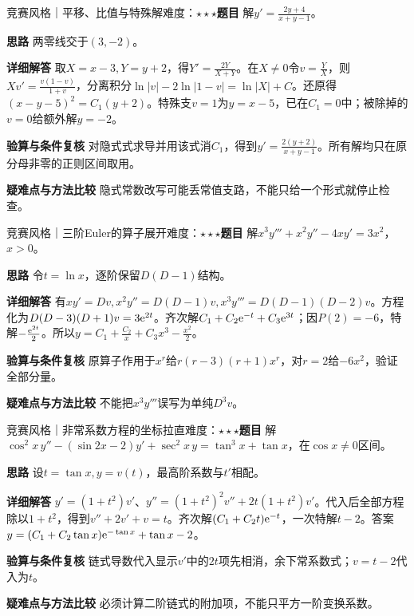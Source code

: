 \begin{example}{竞赛风格｜平移、比值与特殊解}{难度：$\star\star\star$}\label{ic:ex:delta_ode:affinecase}\textbf{题目} 解$y'=\frac{2y+4}{x+y-1}$。\par \textbf{思路} 两零线交于$(3,-2)$。\par \textbf{详细解答} 取$X=x-3,Y=y+2$，得$Y'=\frac{2Y}{X+Y}$。在$X\ne0$令$v=\frac{Y}{X}$，则$Xv'=\frac{v(1-v)}{1+v}$，分离积分$\ln|v|-2\ln|1-v|=\ln|X|+C$。还原得$(x-y-5)^2=C_1(y+2)$。特殊支$v=1$为$y=x-5$，已在$C_1=0$中；被除掉的$v=0$给额外解$y=-2$。\par \textbf{验算与条件复核} 对隐式式求导并用该式消$C_1$，得到$y'=\frac{2(y+2)}{x+y-1}$。所有解均只在原分母非零的正则区间取用。\par \textbf{疑难点与方法比较} 隐式常数改写可能丢常值支路，不能只给一个形式就停止检查。\end{example}

\begin{example}{竞赛风格｜三阶Euler的算子展开}{难度：$\star\star\star$}\label{ic:ex:delta_ode:eulerthirdorder}\textbf{题目} 解$x^3y'''+x^2y''-4xy'=3x^2$，$x>0$。\par \textbf{思路} 令$t=\ln x$，逐阶保留$D(D-1)$结构。\par \textbf{详细解答} 有$xy'=Dv,x^2y''=D(D-1)v,x^3y'''=D(D-1)(D-2)v$。方程化为$D(D-3)(D+1)v=3\mathrm{e}^{2t}$。齐次解$C_1+C_2\mathrm{e}^{-t}+C_3\mathrm{e}^{3t}$；因$P(2)=-6$，特解$-\frac{\mathrm{e}^{2t}}{2}$。所以$y=C_1+\frac{C_2}{x}+C_3x^3-\frac{x^2}{2}$。\par \textbf{验算与条件复核} 原算子作用于$x^r$给$r(r-3)(r+1)x^r$，对$r=2$给$-6x^2$，验证全部分量。\par \textbf{疑难点与方法比较} 不能把$x^3y'''$误写为单纯$D^3v$。\end{example}

\begin{example}{竞赛风格｜非常系数方程的坐标拉直}{难度：$\star\star\star$}\label{ic:ex:delta_ode:tangentcoordinate}\textbf{题目} 解$\cos^2x\,y''-(\sin2x-2)y'+\sec^2x\,y=\tan^3x+\tan x$，在$\cos x\ne0$区间。\par \textbf{思路} 设$t=\tan x,y=v(t)$，最高阶系数与$t'$相配。\par \textbf{详细解答} $y'=(1+t^2)v'$、$y''=(1+t^2)^2v''+2t(1+t^2)v'$。代入后全部方程除以$1+t^2$，得到$v''+2v'+v=t$。齐次解$(C_1+C_2t)\mathrm{e}^{-t}$，一次特解$t-2$。答案$y=(C_1+C_2\tan x)\mathrm{e}^{-\tan x}+\tan x-2$。\par \textbf{验算与条件复核} 链式导数代入显示$v'$中的$2t$项先相消，余下常系数式；$v=t-2$代入为$t$。\par \textbf{疑难点与方法比较} 必须计算二阶链式的附加项，不能只平方一阶变换系数。\end{example}
